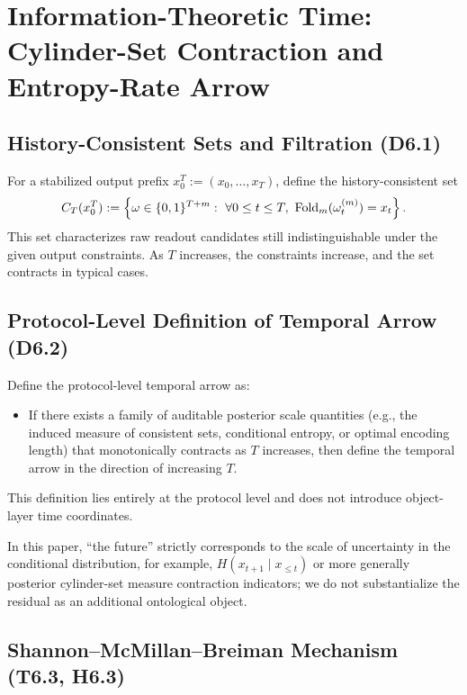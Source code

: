 \section{Information-Theoretic Time: Cylinder-Set Contraction and Entropy-Rate Arrow}\label{sec:info-time}

\subsection{History-Consistent Sets and Filtration (D6.1)}

For a stabilized output prefix $x_0^T:=(x_0,\dots,x_T)$, define the history-consistent set
\[
C_T(x_0^T):=\left\{\omega\in\{0,1\}^{T+m}:\ \forall 0\le t\le T,\ \Fold_m(\omega^{(m)}_t)=x_t\right\}.
\]
This set characterizes raw readout candidates still indistinguishable under the given output constraints. As $T$ increases, the constraints increase, and the set contracts in typical cases.

\subsection{Protocol-Level Definition of Temporal Arrow (D6.2)}

Define the protocol-level temporal arrow as:
\begin{itemize}
  \item If there exists a family of auditable posterior scale quantities (e.g., the induced measure of consistent sets, conditional entropy, or optimal encoding length) that monotonically contracts as $T$ increases, then define the temporal arrow in the direction of increasing $T$.
\end{itemize}
This definition lies entirely at the protocol level and does not introduce object-layer time coordinates.

\begin{remark}
In this paper, ``the future'' strictly corresponds to the scale of uncertainty in the conditional distribution, for example,
$
H(x_{t+1}\mid x_{\le t})
$
or more generally posterior cylinder-set measure contraction indicators; we do not substantialize the residual as an additional ontological object.
\end{remark}

\subsection{Shannon--McMillan--Breiman Mechanism (T6.3, H6.3)}


